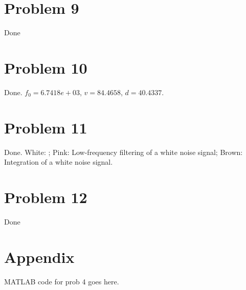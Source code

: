 \documentclass[10pt]{article}
\begin{document}
\section{Problem 9}
Done
\section{Problem 10}
Done. $f_0 = 6.7418e+03$, $v = 84.4658$, $d=40.4337$.
\section{Problem 11}
Done. White: ; Pink: Low-frequency filtering of a white noise signal; Brown: Integration of a white noise signal.
\section{Problem 12}
Done
\section*{Appendix}
MATLAB code for prob 4 goes here.
\end{document}
